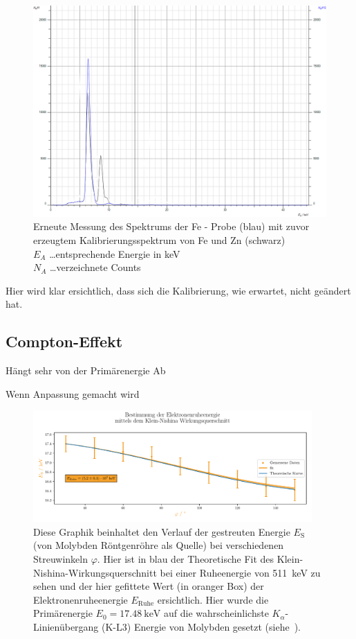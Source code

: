\documentclass[12pt,english,ngerman]{scrartcl}
\begin{document}
\begin{figure}[H]
	\centering
	\includegraphics[width =\textwidth]{./figures/roentgen/KalibrieungErhaltenFe.png}
	\caption[Erneute Messung des Spektrums der Fe - Probe] {Erneute Messung des Spektrums
		der Fe - Probe (blau) mit zuvor erzeugtem Kalibrierungsspektrum von Fe und Zn
		(schwarz)                                \\
		$E_A$ \dots entsprechende Energie in keV \\
		$N_A$ \dots verzeichnete Counts
	}\label{fig:fe_zumSchluss}
\end{figure}

Hier wird klar ersichtlich, dass sich die Kalibrierung, wie erwartet, nicht
geändert hat.

\subsection{Compton-Effekt}

Hängt sehr von der Primärenergie Ab

Wenn Anpassung gemacht wird
\begin{figure}[H]
	\centering
	\includegraphics[width=0.95\textwidth]{figures/Klein-Nishina-Improved.pdf}
	\caption{Diese Graphik beinhaltet den Verlauf der gestreuten
		Energie $E_\text{S}$ (von Molybden Röntgenröhre als Quelle)
		bei verschiedenen Streuwinkeln $\varphi$.
		Hier ist in blau der Theoretische Fit des Klein-Nishina-Wirkungsquerschnitt
		bei einer Ruheenergie von \SI{511}{\kilo\eV} zu sehen und
		der hier gefittete Wert (in oranger Box) der
		Elektronenruheenergie $E_\text{Ruhe}$ ersichtlich.
		Hier wurde die Primärenergie $E_0=\SI{17.48}{\kilo\eV}$ auf die
		wahrscheinlichste $K_\alpha$-Linienübergang (K-L3) Energie von Molybden gesetzt
		(siehe~\cite{noauthor_x-ray_nodate-1}).
	}\label{fig:Klein-Nishina-Improved}
\end{figure}
\end{document}
